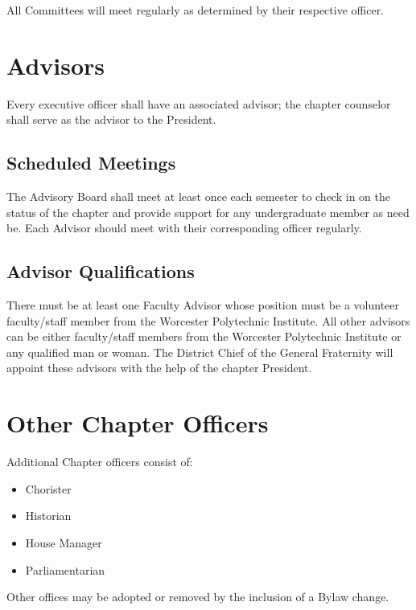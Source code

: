 All Committees will meet regularly as determined by their respective officer.

\section{Advisors}
\label{sec:advisors}

Every executive officer shall have an associated advisor; the chapter counselor
shall serve as the advisor to the President.

\subsection{Scheduled Meetings}
\label{sec:advisory-board-scheduled-meetings}

The Advisory Board shall meet at least once each semester to check in on the
status of the chapter and provide support for any undergraduate member as need
be.
Each Advisor should meet with their corresponding officer regularly.

\subsection{Advisor Qualifications}
\label{sec:advisor-qualifications}

There must be at least one Faculty Advisor whose position must be a volunteer
faculty/staff member from the Worcester Polytechnic Institute.
All other advisors can be either faculty/staff members from the Worcester
Polytechnic Institute or any qualified man or woman.
The District Chief of the General Fraternity will appoint these advisors with
the help of the chapter President.

\section{Other Chapter Officers}
\label{sec:other-chapter-officers}

Additional Chapter officers consist of:

\begin{itemize}
	\item Chorister
	\item Historian
	\item House Manager
	\item Parliamentarian
\end{itemize}

Other offices may be adopted or removed by the inclusion of a Bylaw change.

